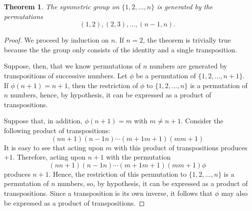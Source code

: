 \documentclass[12pt]{article}
\newtheorem{thm}{Theorem}
\begin{document}
\begin{thm}
The symmetric group on $\{1, 2, \ldots, n\}$ is generated by the permutations
\[
(1, 2), (2, 3), \ldots, (n-1, n).
\]
\end{thm}

\begin{proof}
We proceed by induction on $n$.  If $n = 2$, the theorem is trivially true
because the the group only consists of the identity and a single transposition.

Suppose, then, that we know permutations of $n$ numbers are generated
by transpositions of successive numbers.  Let $\phi$ be a permutation of
$\{1, 2, \ldots, n+1\}$.  If $\phi(n+1) = n+1$, then the restriction of
$\phi$ to $\{1, 2, \ldots, n\}$ is a permutation of $n$ numbers, hence,
by hypothesis, it can be expressed as a product of transpositions.

Suppose that, in addition, $\phi (n+1) = m$ with $m \neq n+1$.  Consider
the following product of transpositions:
\[
(n n+1) (n-1 n) \cdots (m+1 m+1) (m m+1)
\]
It is easy to see that acting upon $m$ with this product of transpositions
produces $+1$.  Therefore, acting upon $n+1$ with the permutation
\[
(n n+1) (n-1 n) \cdots (m+1 m+1) (m m+1) \phi
\]
produces $n+1$.  Hence, the restriction of this permutation to 
$\{1, 2, \ldots, n\}$ is a permutation of $n$ numbers, so,
by hypothesis, it can be expressed as a product of transpositions.
Since a transposition is its own inverse, it follows that
$\phi$ may also be expressed as a product of transpositions.
\end{proof}
\end{document}
